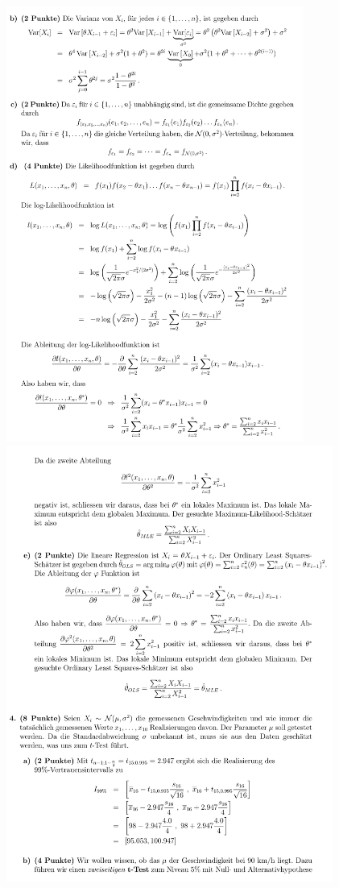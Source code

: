 \includegraphics[height=143mm]{old_exams_prtsrc/cher_infk_wi19_ml-3.png}\newline
\includegraphics[height=143mm]{old_exams_prtsrc/cher_infk_wi19_ml-4.png}\newline

